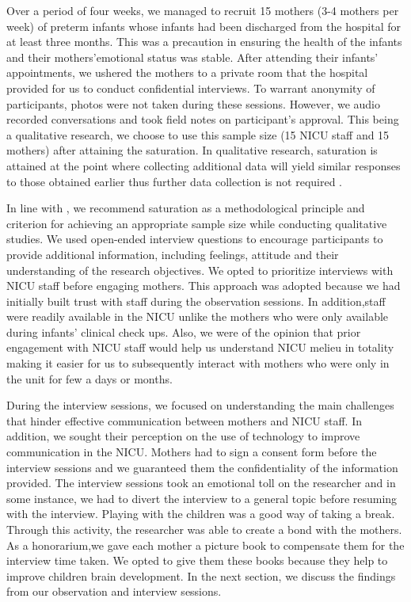 Over a period of four weeks, we managed to recruit 15 mothers (3-4 mothers per week) of preterm infants whose infants had been discharged from the hospital for at least three months. This was a precaution in ensuring the health of the infants and their mothers’emotional status was stable. After attending their infants' appointments, we ushered the mothers to a private room that the hospital provided for us to conduct confidential interviews. To warrant anonymity of participants, photos were not taken during these sessions. However, we audio recorded conversations and took field notes on participant's approval.  This being a qualitative research, we choose to use this sample size (15 NICU staff and 15 mothers) after attaining the saturation. In qualitative research, saturation is attained at the point where collecting additional data will yield similar responses to those obtained earlier thus further data collection is not required \citep{morse2000, Malterud2016}. 

In line with \textcite{Glaser1967}, we recommend saturation as a methodological principle and criterion for achieving an appropriate sample size while conducting qualitative studies. We used open-ended interview questions to encourage participants to provide additional information, including feelings, attitude and their understanding of the research objectives. We opted to prioritize interviews with NICU staff before engaging mothers. This approach was adopted because we had initially built trust with  staff during the observation sessions. In addition,staff were readily available in the NICU unlike the mothers who were only available during infants' clinical check ups. Also, we were of the opinion that prior engagement with NICU staff would help us understand  NICU melieu in totality making it easier for us to subsequently interact with mothers who were only in the unit for few a days or months. 

During the interview sessions, we  focused  on understanding  the  main challenges that hinder effective communication between mothers and NICU staff. In addition, we sought their perception on the use of technology to improve communication in the NICU. Mothers had to sign a consent form before the interview sessions and we guaranteed them  the confidentiality of the information provided. The interview sessions took an emotional toll on the researcher and in some instance, we had to divert the interview to a general topic before resuming with the interview. Playing with the children was a good way of taking a break. Through this activity, the researcher was able to create a bond with the mothers. As a honorarium,we gave each mother a picture book to compensate them for the interview time taken. We opted to give them these books because they help to improve children brain development. In the next section, we discuss the findings from our observation and interview sessions.

